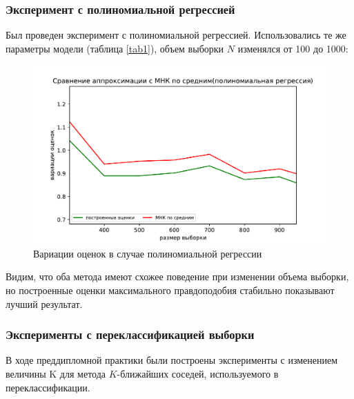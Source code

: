 \subsubsection{Эксперимент с полиномиальной регрессией}
Был проведен эксперимент с полиномиальной регрессией. Использовались те же параметры модели (таблица \ref{tab1}), объем выборки $N$ изменялся от 100 до 1000:
\begin{figure}[h!]
    \centering
    \includegraphics[width=150mm]{../images/polynomial.pdf}
    \caption{Вариации оценок в случае полиномиальной регрессии\label{overflow}}
    \label{pic3}
\end{figure}

Видим, что оба метода имеют схожее поведение при изменении объема выборки, но построенные оценки максимального правдоподобия стабильно показывают лучший результат.

\newpage
\subsubsection{Эксперименты с переклассификацией выборки}\label{ss3_3_1}
В ходе преддипломной практики были построены эксперименты с изменением величины K для метода $K$-ближайших соседей, используемого в переклассификации. 

